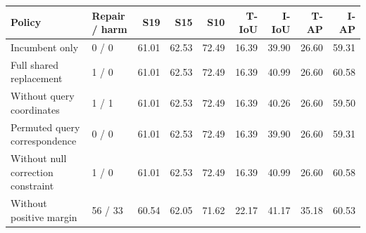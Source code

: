 \begin{tabular}{llrrrrrrr}
\toprule
Policy & Repair / harm & S19 & S15 & S10 & T-IoU & I-IoU & T-AP & I-AP \\
\midrule
Incumbent only & 0 / 0 & 61.01 & 62.53 & 72.49 & 16.39 & 39.90 & 26.60 & 59.31 \\
Full shared replacement & 1 / 0 & 61.01 & 62.53 & 72.49 & 16.39 & 40.99 & 26.60 & 60.58 \\
Without query coordinates & 1 / 1 & 61.01 & 62.53 & 72.49 & 16.39 & 40.26 & 26.60 & 59.50 \\
Permuted query correspondence & 0 / 0 & 61.01 & 62.53 & 72.49 & 16.39 & 39.90 & 26.60 & 59.31 \\
Without null correction constraint & 1 / 0 & 61.01 & 62.53 & 72.49 & 16.39 & 40.99 & 26.60 & 60.58 \\
Without positive margin & 56 / 33 & 60.54 & 62.05 & 71.62 & 22.17 & 41.17 & 35.18 & 60.53 \\
\bottomrule
\end{tabular}
